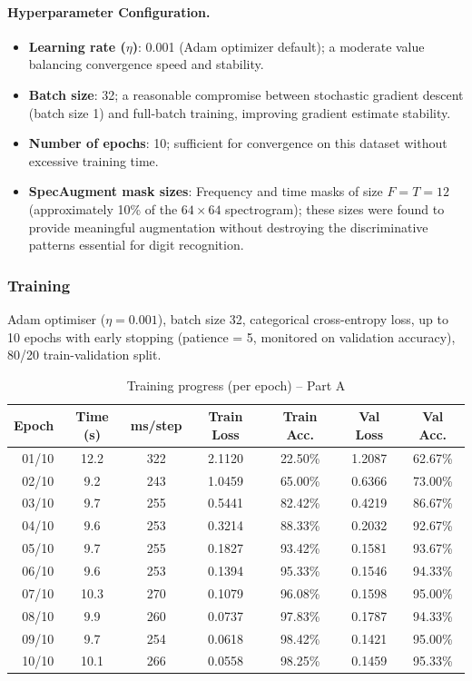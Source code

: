 \paragraph{Hyperparameter Configuration.}
\begin{itemize}
    \item \textbf{Learning rate ($\eta$)}: 0.001 (Adam optimizer default); a moderate value balancing convergence speed and stability.
    \item \textbf{Batch size}: 32; a reasonable compromise between stochastic gradient descent (batch size 1) and full-batch training, improving gradient estimate stability.
    \item \textbf{Number of epochs}: 10; sufficient for convergence on this dataset without excessive training time.
    \item \textbf{SpecAugment mask sizes}: Frequency and time masks of size $F=T=12$ (approximately 10\% of the $64\times64$ spectrogram); these sizes were found to provide meaningful augmentation without destroying the discriminative patterns essential for digit recognition.
\end{itemize}

\subsubsection{Training}

Adam optimiser ($\eta = 0.001$), batch size 32,
categorical cross-entropy loss, up to 10 epochs with early stopping
(patience = 5, monitored on validation accuracy), 80/20 train-validation split.

\begin{table}[H]
\centering
\caption{Training progress (per epoch) -- Part A}
\label{tab:p3_training_epochs}
\begin{tabular}{rcccccc}
\toprule
Epoch & Time (s) & ms/step & Train Loss & Train Acc. & Val Loss & Val Acc. \\
\midrule
01/10 & 12.2 & 322 & 2.1120 & 22.50\% & 1.2087 & 62.67\% \\
02/10 & 9.2  & 243 & 1.0459 & 65.00\% & 0.6366 & 73.00\% \\
03/10 & 9.7  & 255 & 0.5441 & 82.42\% & 0.4219 & 86.67\% \\
04/10 & 9.6  & 253 & 0.3214 & 88.33\% & 0.2032 & 92.67\% \\
05/10 & 9.7  & 255 & 0.1827 & 93.42\% & 0.1581 & 93.67\% \\
06/10 & 9.6  & 253 & 0.1394 & 95.33\% & 0.1546 & 94.33\% \\
07/10 & 10.3 & 270 & 0.1079 & 96.08\% & 0.1598 & 95.00\% \\
08/10 & 9.9  & 260 & 0.0737 & 97.83\% & 0.1787 & 94.33\% \\
09/10 & 9.7  & 254 & 0.0618 & 98.42\% & 0.1421 & 95.00\% \\
10/10 & 10.1 & 266 & 0.0558 & 98.25\% & 0.1459 & 95.33\% \\
\bottomrule
\end{tabular}
\end{table}

